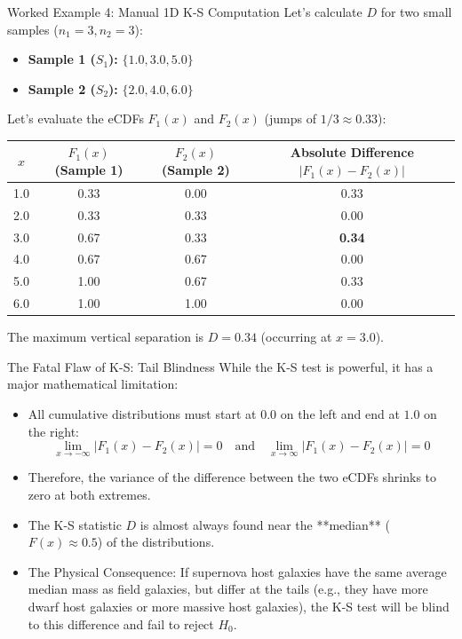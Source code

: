 \documentclass[9pt]{beamer}
\begin{document}
\begin{frame}{Worked Example 4: Manual 1D K-S Computation}
  Let's calculate $D$ for two small samples ($n_1=3, n_2=3$):
  \begin{itemize}
    \item \textbf{Sample 1 ($S_1$):} $\{1.0, 3.0, 5.0\}$
    \item \textbf{Sample 2 ($S_2$):} $\{2.0, 4.0, 6.0\}$
  \end{itemize}
  Let's evaluate the eCDFs $F_1(x)$ and $F_2(x)$ (jumps of $1/3 \approx 0.33$):
  \begin{table}
    \centering
    \begin{tabular}{cccc}
      \toprule
      $x$ & $F_1(x)$ (Sample 1) & $F_2(x)$ (Sample 2) & Absolute Difference $|F_1(x) - F_2(x)|$ \\
      \midrule
      1.0 & 0.33 & 0.00 & 0.33 \\
      2.0 & 0.33 & 0.33 & 0.00 \\
      3.0 & 0.67 & 0.33 & \textbf{0.34} \\
      4.0 & 0.67 & 0.67 & 0.00 \\
      5.0 & 1.00 & 0.67 & 0.33 \\
      6.0 & 1.00 & 1.00 & 0.00 \\
      \bottomrule
    \end{tabular}
  \end{table}
  The maximum vertical separation is $D = 0.34$ (occurring at $x=3.0$).
\end{frame}

\begin{frame}{The Fatal Flaw of K-S: Tail Blindness}
  While the K-S test is powerful, it has a major mathematical limitation:
  \begin{itemize}
    \item All cumulative distributions must start at $0.0$ on the left and end at $1.0$ on the right:
      $$\lim_{x \to -\infty} |F_1(x) - F_2(x)| = 0 \quad \text{and} \quad \lim_{x \to \infty} |F_1(x) - F_2(x)| = 0$$
    \item Therefore, the variance of the difference between the two eCDFs shrinks to zero at both extremes.
    \item The K-S statistic $D$ is almost always found near the **median** ($F(x) \approx 0.5$) of the distributions.
    \item \alert{The Physical Consequence:}
      If supernova host galaxies have the same average median mass as field galaxies, but differ at the tails (e.g., they have more dwarf host galaxies or more massive host galaxies), the K-S test will be blind to this difference and fail to reject $H_0$.
  \end{itemize}
\end{frame}
\end{document}
